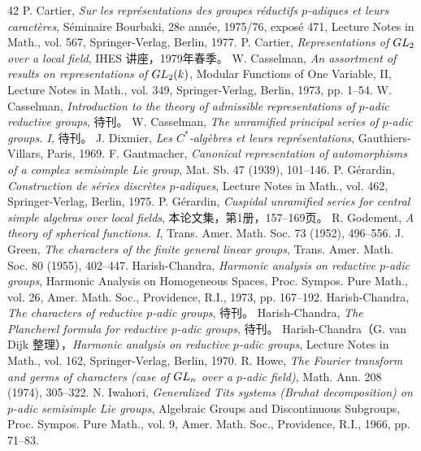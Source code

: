 \begin{thebibliography}{42}
 P. Cartier, \emph{Sur les représentations des groupes réductifs $p$-adiques et leurs caractères}, Séminaire Bourbaki, 28e année, 1975/76, exposé 471, Lecture Notes in Math., vol. 567, Springer-Verlag, Berlin, 1977.
 P. Cartier, \emph{Representations of $GL_2$ over a local field}, IHES 讲座，1979年春季。
 W. Casselman, \emph{An assortment of results on representations of $GL_2(k)$}, Modular Functions of One Variable, II, Lecture Notes in Math., vol. 349, Springer-Verlag, Berlin, 1973, pp. 1--54.
 W. Casselman, \emph{Introduction to the theory of admissible representations of $p$-adic reductive groups}, 待刊。
 W. Casselman, \emph{The unramified principal series of $p$-adic groups. I}, 待刊。
 J. Dixmier, \emph{Les $C^*$-algèbres et leurs représentations}, Gauthiers-Villars, Paris, 1969.
 F. Gantmacher, \emph{Canonical representation of automorphisms of a complex semisimple Lie group}, Mat. Sb. 47 (1939), 101--146.
 P. Gérardin, \emph{Construction de séries discrètes $p$-adiques}, Lecture Notes in Math., vol. 462, Springer-Verlag, Berlin, 1975.
 P. Gérardin, \emph{Cuspidal unramified series for central simple algebras over local fields}, 本论文集，第1册，157--169页。
 R. Godement, \emph{A theory of spherical functions. I}, Trans. Amer. Math. Soc. 73 (1952), 496--556.
 J. Green, \emph{The characters of the finite general linear groups}, Trans. Amer. Math. Soc. 80 (1955), 402--447.
 Harish-Chandra, \emph{Harmonic analysis on reductive $p$-adic groups}, Harmonic Analysis on Homogeneous Spaces, Proc. Sympos. Pure Math., vol. 26, Amer. Math. Soc., Providence, R.I., 1973, pp. 167--192.
 Harish-Chandra, \emph{The characters of reductive $p$-adic groups}, 待刊。
 Harish-Chandra, \emph{The Plancherel formula for reductive $p$-adic groups}, 待刊。
 Harish-Chandra（G. van Dijk 整理），\emph{Harmonic analysis on reductive $p$-adic groups}, Lecture Notes in Math., vol. 162, Springer-Verlag, Berlin, 1970.
 R. Howe, \emph{The Fourier transform and germs of characters (case of $GL_n$ over a $p$-adic field)}, Math. Ann. 208 (1974), 305--322.
 N. Iwahori, \emph{Generalized Tits systems (Bruhat decomposition) on $p$-adic semisimple Lie groups}, Algebraic Groups and Discontinuous Subgroups, Proc. Sympos. Pure Math., vol. 9, Amer. Math. Soc., Providence, R.I., 1966, pp. 71--83.

\end{thebibliography}
